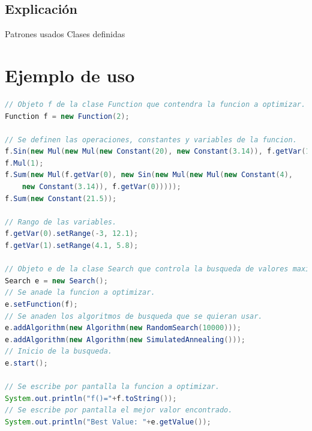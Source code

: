 \documentclass{article}
\theoremstyle{definition}
\theoremstyle{remark}
\begin{document}
\subsection{Explicación}
Patrones usados
Clases definidas

\newpage
\section{Ejemplo de uso}
\begin{lstlisting}[language=Java]
// Objeto f de la clase Function que contendra la funcion a optimizar.
Function f = new Function(2);

// Se definen las operaciones, constantes y variables de la funcion.
f.Sin(new Mul(new Mul(new Constant(20), new Constant(3.14)), f.getVar(1)));
f.Mul(1);
f.Sum(new Mul(f.getVar(0), new Sin(new Mul(new Mul(new Constant(4), 
	new Constant(3.14)), f.getVar(0)))));
f.Sum(new Constant(21.5));
        
// Rango de las variables.
f.getVar(0).setRange(-3, 12.1);
f.getVar(1).setRange(4.1, 5.8);
        
// Objeto e de la clase Search que controla la busqueda de valores maximos.
Search e = new Search();
// Se anade la funcion a optimizar.
e.setFunction(f);
// Se anaden los algoritmos de busqueda que se quieran usar.
e.addAlgorithm(new Algorithm(new RandomSearch(10000)));
e.addAlgorithm(new Algorithm(new SimulatedAnnealing()));
// Inicio de la busqueda.
e.start();
        
// Se escribe por pantalla la funcion a optimizar.
System.out.println("f()="+f.toString());
// Se escribe por pantalla el mejor valor encontrado.
System.out.println("Best Value: "+e.getValue());
\end{lstlisting}
\end{document}
